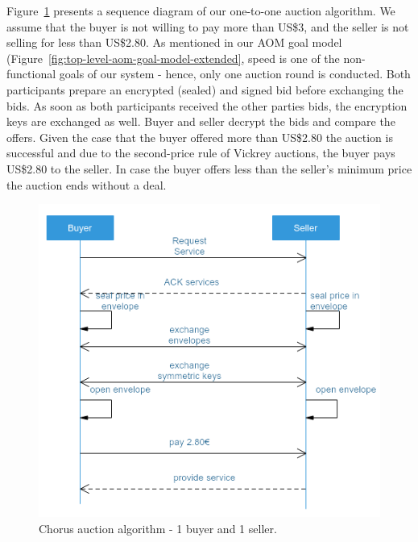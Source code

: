 \documentclass{llncs}
\begin{document}
{			Figure~\ref{fig:auction-algorithm-1-1} presents a sequence diagram of our one-to-one auction algorithm. We assume that the buyer is not willing to pay more than US\$3, and the seller is not selling for less than US\$2.80. As mentioned in our AOM goal model (Figure~\ref{fig:top-level-aom-goal-model-extended}, speed is one of the non-functional goals of our system - hence, only one auction round is conducted.  Both participants prepare an encrypted (sealed) and signed bid before exchanging the bids. As soon as both participants received the other parties bids, the encryption keys are exchanged as well. Buyer and seller decrypt the bids and compare the offers. Given the case that the buyer offered more than US\$2.80 the auction is successful and due to the second-price rule of Vickrey auctions, the buyer pays US\$2.80 to the seller. In case the buyer offers less than the seller's minimum price the auction ends without a deal.
			
			\begin{figure}
				\centering
				\includegraphics[scale=0.5]{Figures/auction/20180501_auction-aglorithms--1-to-1.png}
				\caption{Chorus auction algorithm - 1 buyer and 1 seller.}	
				\label{fig:auction-algorithm-1-1}
			\end{figure}

}
\end{document}

